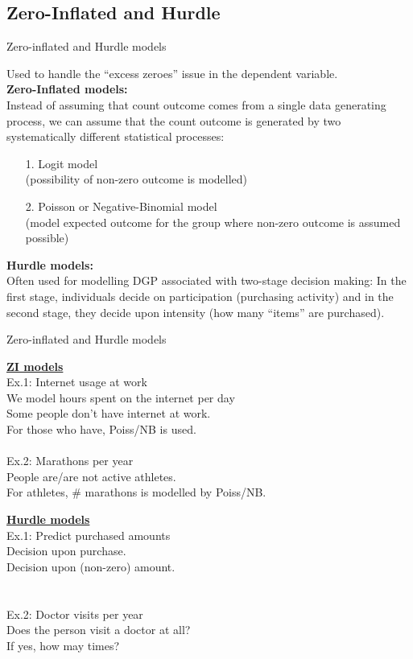 \documentclass[usenames,dvipsnames]{beamer}
\begin{document}
\subsection{Zero-Inflated and Hurdle}
\begin{frame}{Zero-inflated and Hurdle models}

{\small
Used to handle the “excess zeroes” issue in the dependent variable. \\
\bigskip
\textbf{Zero-Inflated models:}\\
Instead of assuming that count outcome comes from a single data generating process, we can assume that the count outcome is generated by two systematically different statistical processes:
\begin{itemize}
\item[1.] Logit model \\
(possibility of non-zero outcome is modelled)
\item[2.] Poisson or Negative-Binomial model \\
(model expected outcome for the group where non-zero outcome is assumed possible)
\end{itemize}
\bigskip
\textbf{Hurdle models:}\\
Often used for modelling DGP associated with two-stage decision making: In the first stage, individuals decide on participation (purchasing activity) and in the second stage, they decide upon intensity (how many ``items'' are purchased).
}
\end{frame}
\begin{frame}{Zero-inflated and Hurdle models}
\begin{minipage}[t]{.49\textwidth}
\underline{\textbf{ZI models}} \\

\small{Ex.1: Internet usage at work\\
We model hours spent on the internet per day\\
Some people don't have internet at work.\\
For those who have, Poiss/NB is used.\\
~\\
Ex.2: Marathons per year\\
People are/are not active athletes.\\
For athletes, \# marathons is modelled by Poiss/NB.}
\end{minipage}%
\hspace*{7mm}
\begin{minipage}[t]{.49\textwidth}
\underline{\textbf{Hurdle models}} \\

\small{Ex.1: Predict purchased amounts \\
Decision upon purchase.\\
Decision upon (non-zero) amount.\\
~\\
~\\
Ex.2: Doctor visits per year\\
Does the person visit a doctor at all?\\
If yes, how may times?}
\end{minipage}
\end{frame}
\end{document}
